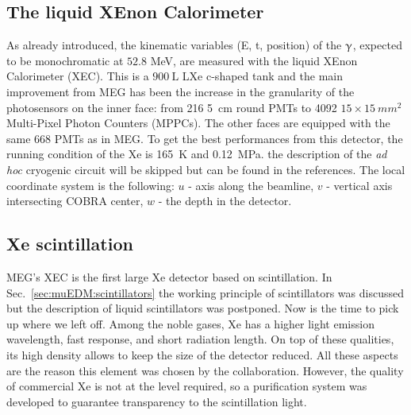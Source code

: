 \begin{refsection}
\section{The liquid XEnon Calorimeter}
    As already introduced, the kinematic variables (E, t, position) of the $\upgamma$, expected to be monochromatic at $52.8$ MeV, are measured with the liquid XEnon Calorimeter (XEC).
    This is a $\SI{900}{\liter}$ LXe c-shaped tank and the main improvement from MEG has been the increase in the granularity of the photosensors on the inner face: from 216 \SI{5}{cm} round PMTs to 4092 $15\times\SI{15}{mm^2}$ Multi-Pixel Photon Counters (MPPCs). 
    The other faces are equipped with the same 668 PMTs as in MEG.
    To get the best performances from this detector, the running condition of the Xe is \SI{165}{\kelvin} and \SI{0.12}{MPa}. the description of the \textit{ad hoc} cryogenic circuit will be skipped but can be found in the references.
    The local coordinate system is the following: $u$ - axis along the beamline, $v$ - vertical axis intersecting COBRA center, $w$ - the depth in the detector.
    

    \subsection{Xe scintillation}
        MEG's XEC is the first large Xe detector based on scintillation.
        In Sec.~\ref{sec:muEDM:scintillators} the working principle of scintillators was discussed but the description of liquid scintillators was postponed. 
        Now is the time to pick up where we left off.
        Among the noble gases, Xe has a higher light emission wavelength, fast response, and short radiation length.
        On top of these qualities, its high density allows to keep the size of the detector reduced.
        All these aspects are the reason this element was chosen by the collaboration.
        However, the quality of commercial Xe is not at the level required, so a purification system was developed to guarantee transparency to the scintillation light.\\
        

\end{refsection}
